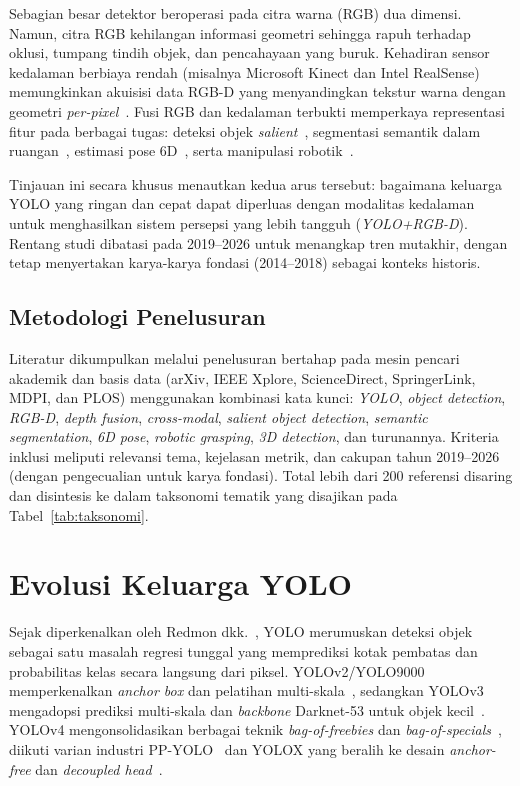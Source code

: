 \documentclass[11pt,a4paper]{article}
\begin{document}
Sebagian besar detektor beroperasi pada citra warna (RGB) dua dimensi. Namun,
citra RGB kehilangan informasi geometri sehingga rapuh terhadap oklusi,
tumpang tindih objek, dan pencahayaan yang buruk. Kehadiran sensor kedalaman
berbiaya rendah (misalnya Microsoft Kinect dan Intel RealSense) memungkinkan
akuisisi data RGB-D yang menyandingkan tekstur warna dengan geometri
\emph{per-pixel}~\cite{silberman2012nyu,song2015sunrgbd}. Fusi RGB dan kedalaman
terbukti memperkaya representasi fitur pada berbagai tugas: deteksi objek
\emph{salient}~\cite{zhou2021rgbdsurvey}, segmentasi semantik dalam
ruangan~\cite{hazirbas2016fusenet}, estimasi pose 6D~\cite{wang2019densefusion},
serta manipulasi robotik~\cite{morrison2018ggcnn}.

Tinjauan ini secara khusus menautkan kedua arus tersebut: bagaimana keluarga
YOLO yang ringan dan cepat dapat diperluas dengan modalitas kedalaman untuk
menghasilkan sistem persepsi yang lebih tangguh (\emph{YOLO+RGB-D}). Rentang
studi dibatasi pada 2019--2026 untuk menangkap tren mutakhir, dengan tetap
menyertakan karya-karya fondasi (2014--2018) sebagai konteks historis.

\subsection{Metodologi Penelusuran}
Literatur dikumpulkan melalui penelusuran bertahap pada mesin pencari akademik
dan basis data (arXiv, IEEE Xplore, ScienceDirect, SpringerLink, MDPI, dan PLOS)
menggunakan kombinasi kata kunci: \emph{YOLO}, \emph{object detection},
\emph{RGB-D}, \emph{depth fusion}, \emph{cross-modal}, \emph{salient object
detection}, \emph{semantic segmentation}, \emph{6D pose}, \emph{robotic
grasping}, \emph{3D detection}, dan turunannya. Kriteria inklusi meliputi
relevansi tema, kejelasan metrik, dan cakupan tahun 2019--2026 (dengan
pengecualian untuk karya fondasi). Total lebih dari 200 referensi disaring dan
disintesis ke dalam taksonomi tematik yang disajikan pada
Tabel~\ref{tab:taksonomi}.

\section{Evolusi Keluarga YOLO}
Sejak diperkenalkan oleh Redmon dkk.~\cite{redmon2016yolo}, YOLO merumuskan
deteksi objek sebagai satu masalah regresi tunggal yang memprediksi kotak
pembatas dan probabilitas kelas secara langsung dari piksel. YOLOv2/YOLO9000
memperkenalkan \emph{anchor box} dan pelatihan multi-skala~\cite{redmon2017yolo9000},
sedangkan YOLOv3 mengadopsi prediksi multi-skala dan \emph{backbone} Darknet-53
untuk objek kecil~\cite{redmon2018yolov3}. YOLOv4 mengonsolidasikan berbagai
teknik \emph{bag-of-freebies} dan \emph{bag-of-specials}~\cite{bochkovskiy2020yolov4},
diikuti varian industri PP-YOLO~\cite{long2020ppyolo} dan YOLOX yang beralih ke
desain \emph{anchor-free} dan \emph{decoupled head}~\cite{ge2021yolox}.
\end{document}
